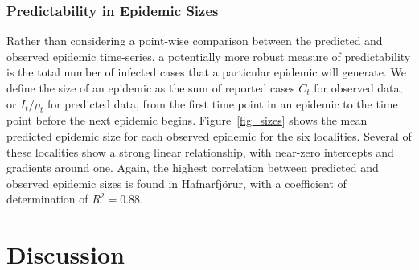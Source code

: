 \documentclass[10pt]{article}
\begin{document}
\subsubsection*{Predictability in Epidemic Sizes}

Rather than considering a point-wise comparison between the predicted and observed epidemic time-series, a potentially more robust measure of predictability is the total number of infected cases that a particular epidemic will generate. We define the size of an epidemic as the sum of reported cases $C_t$ for observed data, or $I_t / \rho_t$ for predicted data, from the first time point in an epidemic to the time point before the next epidemic begins. Figure~\ref{fig_sizes} shows the mean predicted epidemic size for each observed epidemic for the six localities. Several of these localities show a strong linear relationship, with near-zero intercepts and gradients around one. Again, the highest correlation between predicted and observed epidemic sizes is found in Hafnarfj\"{o}r\dh{}ur, with a coefficient of determination of $R^2 = 0.88$.







	 




























\section*{Discussion}
\end{document}
